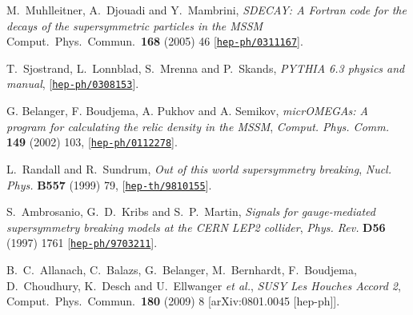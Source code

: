 \documentclass{article}
\begin{document}
\begin{thebibliography}{10}
M.~Muhlleitner, A.~Djouadi and Y.~Mambrini,
{\em SDECAY: A Fortran code for the decays of the supersymmetric particles in the
MSSM} 
Comput.\ Phys.\ Commun.\  {\bf 168} (2005) 46
[\href{http://xxx.lanl.gov/abs/hep-ph/0311167}{{\tt hep-ph/0311167}}].

T.~Sjostrand, L.~Lonnblad, S.~Mrenna and P.~Skands,
{\em PYTHIA 6.3 physics and manual}, 
[\href{http://xxx.lanl.gov/abs/hep-ph/0308153}{{\tt hep-ph/0308153}}].

G. Belanger, F. Boudjema, A. Pukhov and A. Semikov,
{\it micrOMEGAs: A program for calculating the relic density in the MSSM},
{\em Comput. Phys. Comm.} {\bf 149} (2002) 103,
  [\href{http://xxx.lanl.gov/abs/hep-ph/0112278}{{\tt hep-ph/0112278}}].

L.~Randall and R.~Sundrum, {\it Out of this world supersymmetry breaking},
  {\em Nucl. Phys.} {\bf B557} (1999) 79,
  [\href{http://xxx.lanl.gov/abs/hep-th/9810155}{{\tt hep-th/9810155}}].

S.~Ambrosanio, G.~D.~Kribs and S.~P.~Martin,
{\it Signals for gauge-mediated supersymmetry breaking models at the CERN
LEP2 collider}, 
{\em Phys. Rev.} {\bf D56} (1997) 1761
  [\href{http://xxx.lanl.gov/abs/hep-ph/9703211}{{\tt hep-ph/9703211}}].

B.~C.~Allanach, C.~Balazs, G.~Belanger, M.~Bernhardt, F.~Boudjema, D.~Choudhury, K.~Desch and U.~Ellwanger {\it et al.},
  {\em SUSY Les Houches Accord 2},
  Comput.\ Phys.\ Commun.\  {\bf 180} (2009) 8
  [arXiv:0801.0045 [hep-ph]].
\end{thebibliography}\endgroup
\end{document}
